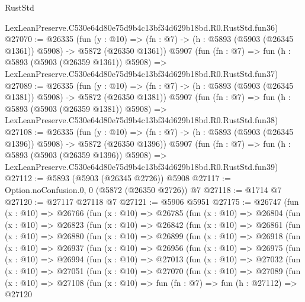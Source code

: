\begin{lexlean}{RustStd}
\begin{coremodule}
    LexLeanPreserve.C530e64d80e75d9b4c13bf34d629b18bd.R0.RustStd.fun36)
@27070 := @26335
    (fun (y : @10) => (fn : @7) -> (h : @5893 (@5903 (@26345 @1361)) @5908) -> @5872 (@26350 @1361))
    @5907
    (fun (fn : @7) =>
    fun (h : @5893 (@5903 (@26359 @1361)) @5908) =>
    LexLeanPreserve.C530e64d80e75d9b4c13bf34d629b18bd.R0.RustStd.fun37)
@27089 := @26335
    (fun (y : @10) => (fn : @7) -> (h : @5893 (@5903 (@26345 @1381)) @5908) -> @5872 (@26350 @1381))
    @5907
    (fun (fn : @7) =>
    fun (h : @5893 (@5903 (@26359 @1381)) @5908) =>
    LexLeanPreserve.C530e64d80e75d9b4c13bf34d629b18bd.R0.RustStd.fun38)
@27108 := @26335
    (fun (y : @10) => (fn : @7) -> (h : @5893 (@5903 (@26345 @1396)) @5908) -> @5872 (@26350 @1396))
    @5907
    (fun (fn : @7) =>
    fun (h : @5893 (@5903 (@26359 @1396)) @5908) =>
    LexLeanPreserve.C530e64d80e75d9b4c13bf34d629b18bd.R0.RustStd.fun39)
@27112 := @5893 (@5903 (@26345 @2726)) @5908
@27117 := Option.noConfusion.{0, 0} (@5872 (@26350 @2726)) @7
@27118 := @1714 @7
@27120 := @27117 @27118 @7
@27121 := @5906 @5951
@27175 := @26747
    (fun (x : @10) =>
    @26766
      (fun (x : @10) =>
      @26785
        (fun (x : @10) =>
        @26804
          (fun (x : @10) =>
          @26823
            (fun (x : @10) =>
            @26842
              (fun (x : @10) =>
              @26861
                (fun (x : @10) =>
                @26880
                  (fun (x : @10) =>
                  @26899
                    (fun (x : @10) =>
                    @26918
                      (fun (x : @10) =>
                      @26937
                        (fun (x : @10) =>
                        @26956
                          (fun (x : @10) =>
                          @26975
                            (fun (x : @10) =>
                            @26994
                              (fun (x : @10) =>
                              @27013
                                (fun (x : @10) =>
                                @27032
                                  (fun (x : @10) =>
                                  @27051
                                    (fun (x : @10) =>
                                    @27070
                                      (fun (x : @10) =>
                                      @27089
                                        (fun (x : @10) =>
                                        @27108
                                          (fun (x : @10) =>
                                          fun (fn : @7) =>
                                          fun (h : @27112) =>
                                          @27120

\end{coremodule}
\end{lexlean}
